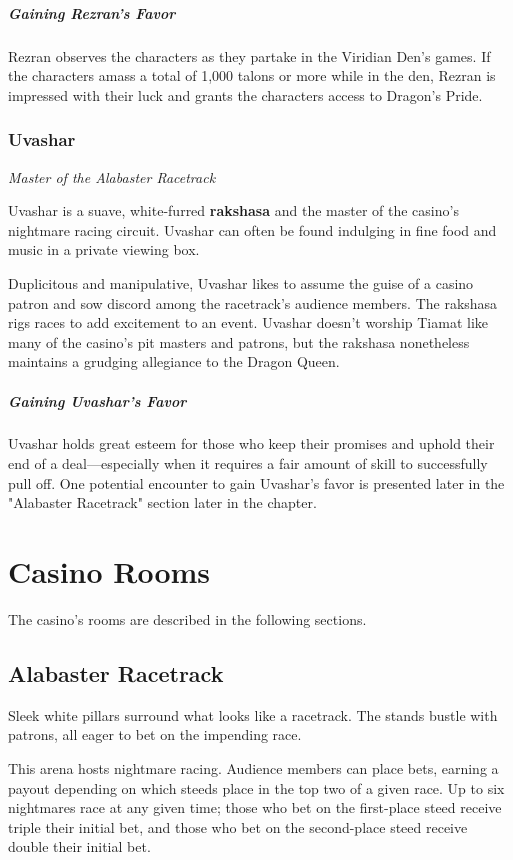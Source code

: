 \documentclass[10pt,a4paper,twoside,bg=print,twocolumn,openany,nodeprecatedcode]{dndbook}
\begin{document}
\subparagraph{Gaining Rezran's Favor}
Rezran observes the characters as they partake in the Viridian Den's games. If the characters amass a total of 1,000 talons or more while in the den, Rezran is impressed with their luck and grants the characters access to Dragon's Pride.

\subsubsection{Uvashar}
\textit{Master of the Alabaster Racetrack}

Uvashar is a suave, white-furred \textbf{rakshasa} and the master of the casino's nightmare racing circuit. Uvashar can often be found indulging in fine food and music in a private viewing box.

Duplicitous and manipulative, Uvashar likes to assume the guise of a casino patron and sow discord among the racetrack's audience members. The rakshasa rigs races to add excitement to an event. Uvashar doesn't worship Tiamat like many of the casino's pit masters and patrons, but the rakshasa nonetheless maintains a grudging allegiance to the Dragon Queen.

\subparagraph{Gaining Uvashar's Favor}
Uvashar holds great esteem for those who keep their promises and uphold their end of a deal—especially when it requires a fair amount of skill to successfully pull off. One potential encounter to gain Uvashar's favor is presented later in the "Alabaster Racetrack" section later in the chapter.

\section{Casino Rooms}
The casino's rooms are described in the following sections.

\subsection{Alabaster Racetrack}
\begin{DndReadAloud}{}
Sleek white pillars surround what looks like a racetrack. The stands bustle with patrons, all eager to bet on the impending race.

\end{DndReadAloud}

This arena hosts nightmare racing. Audience members can place bets, earning a payout depending on which steeds place in the top two of a given race. Up to six nightmares race at any given time; those who bet on the first-place steed receive triple their initial bet, and those who bet on the second-place steed receive double their initial bet.
\end{document}
